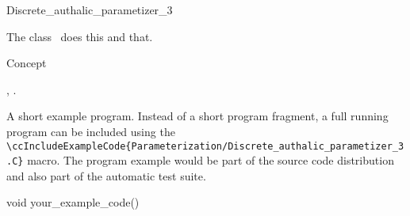 

\begin{ccRefClass}{Discrete_authalic_parametizer_3}  %


\ccDefinition
  
The class \ccRefName\ does this and that.


\ccIsModel

Concept

\ccTypes


\ccCreation
{}  %


\ccOperations


\ccSeeAlso

,
.

\ccExample

A short example program.
Instead of a short program fragment, a full running program can be
included using the 
\verb|\ccIncludeExampleCode{Parameterization/Discrete_authalic_parametizer_3.C}| 
macro. The program example would be part of the source code distribution and
also part of the automatic test suite.

\begin{ccExampleCode}
void your_example_code() {
}
\end{ccExampleCode}


\end{ccRefClass}


